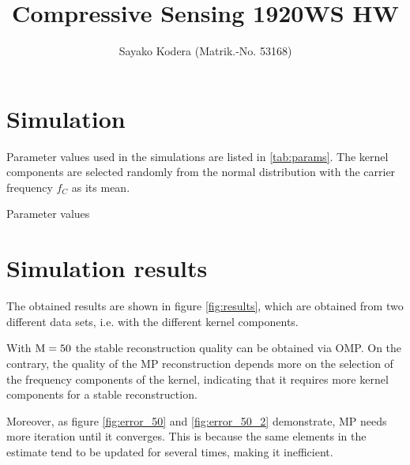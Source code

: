 \documentclass[10pt,a4paper]{article}
\begin{document}
\title{Compressive Sensing 1920WS HW}
\author{Sayako Kodera (Matrik.-No. 53168)\\} 
\date{}

\maketitle

\section{Simulation}
Parameter values used in the simulations are listed in \ref{tab:params}. The kernel components are selected randomly from the normal distribution with the carrier frequency $f_{C}$ as its mean. 

\begin{table}[ht]
\centering

\caption{Parameter values}
\label{tab:params}
\end{table}

\section{Simulation results}
The obtained results are shown in figure \ref{fig:results}, which are obtained from two different data sets, i.e. with the different kernel components. 

With $\operatorname{M} = 50$ the stable reconstruction quality can be obtained via OMP. On the contrary, the quality of the MP reconstruction depends more on the selection of the frequency components of the kernel, indicating that it requires more kernel components for a stable reconstruction. 

Moreover, as figure \ref{fig:error_50} and \ref{fig:error_50_2} demonstrate, MP needs more iteration until it converges. This is because the same elements in the estimate tend to be updated for several times, making it inefficient. 
\end{document}
